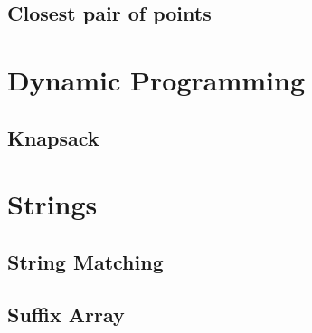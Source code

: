 \documentclass[10pt,a4paper,titlepage]{article}
\begin{document}



\subsection{Closest pair of points}



\fi

\section{Dynamic Programming}
\subsection{Knapsack}



\section{Strings} 

\subsection{String Matching}

\iffalse
\subsection{Suffix Array}
\end{document}
